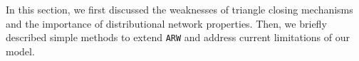 In this section, we first discussed the weaknesses of triangle closing mechanisms
and the importance of distributional network properties. Then, we briefly described
simple methods to extend \texttt{ARW} and address current limitations of our model.
%

%
%

